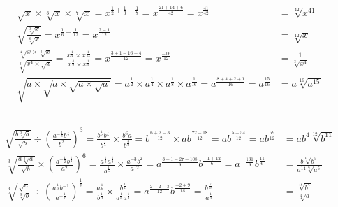 \documentclass[a4paper,12pt]{article}
\begin{document}
\subsection{} %

\begin{align*}
\sqrt{x} \times \sqrt[3]{x} \times \sqrt[7]{x}
= x^{\frac{1}{2} + \frac{1}{3} + \frac{1}{7}}
= x^{\frac{21 + 14 + 6}{42}}
= x^{\frac{41}{42}}
&= \sqrt[42]{x^{41}} \\[6pt]
\sqrt{\frac{\sqrt[3]{x}}{\sqrt[6]{x}}}
= x^{\frac{1}{6} - \frac{1}{12}}
= x^{\frac{2 - 1}{12}}
&= \sqrt[12]{x} \\[6pt]
\frac{\sqrt[4]{x \times \sqrt[3]{x}}}{\sqrt[3]{x^4 \times \sqrt{x}}}
= \frac{x^{\frac{1}{4}} \times x^{\frac{1}{12}}}{x^{\frac{4}{3}} \times x^{\frac{1}{3}}} 
= x^{\frac{3 + 1 - 16 - 4}{12}}
= x^{\frac{-16}{12}}
&= \frac{1}{\sqrt[3]{x^4}} \\[6pt]
\sqrt{a \times \sqrt{a \times \sqrt{a \times \sqrt{a}}}}
= a^{\frac{1}{2}} \times a^{\frac{1}{4}} \times a^{\frac{1}{8}} \times a^{\frac{1}{16}}
= a^{\frac{8 + 4 + 2 + 1}{16}}
= a^{\frac{15}{16}}
&= a\sqrt[16]{a^{15}}
\end{align*}

\subsection{} %

\begin{align*}
\sqrt{\frac{b\sqrt[3]{b}}{\sqrt{b}}} \div \left( \frac{a^{-\frac{1}{3}}b^{\frac{1}{2}}}{b^2} \right)^3
= \frac{b^{\frac{1}{2}}b^{\frac{1}{6}}}{b^{\frac{1}{4}}} \times \frac{b^6a}{b^{\frac{3}{2}}}
= b^{\frac{6 + 2 - 3}{12}} \times ab^{\frac{72 - 18}{12}}
= ab^{\frac{5 + 54}{12}}
= ab^{\frac{59}{12}}
&= ab^4\sqrt[12]{b^{11}} \\[6pt]
\sqrt[3]{\frac{a\sqrt[3]{a}}{\sqrt{b}}} \times \left( \frac{a^{-\frac{1}{2}}b^{\frac{1}{3}}}{a^2} \right)^6
= \frac{a^{\frac{1}{3}}a^{\frac{1}{9}}}{b^{\frac{1}{6}}} \times \frac{a^{-3}b^{2}}{a^{12}}
= a^{\frac{3 + 1 - 27 - 108}{9}}b^{\frac{-1 + 12}{6}}
= a^{-\frac{131}{9}}b^{\frac{11}{6}}
&= \frac{b \sqrt[6]{b^5}}{a^{14}\sqrt[9]{a^5}} \\[6pt]
\sqrt[3]{\frac{\sqrt{a}}{\sqrt[3]{b}}} \div \left( \frac{a^{\frac{1}{3}}b^{-1}}{a^{-\frac{1}{2}}} \right)^{\frac{1}{2}}
= \frac{a^{\frac{1}{6}}}{b^{\frac{1}{9}}} \times \frac{b^{\frac{1}{2}}}{a^{\frac{1}{6}}a^{\frac{1}{4}}}
= a^{\frac{2 - 2 - 3}{12}}b^{\frac{-2 + 9}{18}}
= \frac{b^{\frac{7}{18}}}{a^{\frac{1}{4}}}
&= \frac{\sqrt[18]{b^7}}{\sqrt[4]{a}}
\end{align*}
\end{document}
